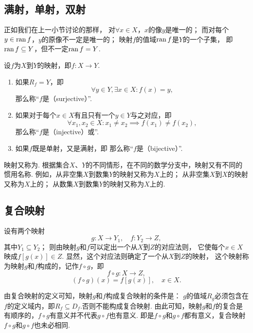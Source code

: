 \subsection{满射，单射，双射}
正如我们在上一小节讨论的那样，
对\(\forall x \in X\)，\(x\)的像\(y\)是唯一的；
而对每个\(y \in \operatorname{ran} f\)，\(y\)的原像不一定是唯一的；
映射\(f\)的值域\(\operatorname{ran} f\)是\(Y\)的一个子集，
即\(\operatorname{ran} f \subseteq Y\)，但不一定\(\operatorname{ran} f = Y\).

\begin{definition}
	设\(f\)为\(X\)到\(Y\)的映射，即\(f\colon X \to Y\).
	\begin{enumerate}
		\item 如果\(R_f = Y\)，即\[
			\forall y \in Y, \exists x \in X:
			f(x) = y,
		\]
		那么称“\(f\)是（surjective）”.

		\item 如果对于每个\(x \in X\)有且只有一个\(y \in Y\)与之对应，即\[
			\forall x_1, x_2 \in X:
			x_1 \neq x_2
			\implies
			f(x_1) \neq f(x_2),
		\]
		那么称“\(f\)是（injective）或”.

		\item 如果\(f\)既是单射，又是满射，即
		那么称“\(f\)是（bijective）”.
	\end{enumerate}
\end{definition}

映射又称为.
根据集合\(X\)、\(Y\)的不同情形，在不同的数学分支中，映射又有不同的惯用名称.
例如，从非空集\(X\)到数集\(Y\)的映射又称为\(X\)上的；
从非空集\(X\)到\(X\)的映射又称为\(X\)上的；
从数集\(X\)到数集\(Y\)的映射又称为\(X\)上的.

\subsection{复合映射}
\begin{definition}
设有两个映射\[
g\colon X \to Y_1, \quad f\colon Y_2 \to Z,
\]其中\(Y_1 \subseteq Y_2\)；
则由映射\(g\)和\(f\)可以定出一个从\(X\)到\(Z\)的对应法则，
它使每个\(x \in X\)映成\(f[g(x)] \in Z\).
显然，这个对应法则确定了一个从\(X\)到\(Z\)的映射，
这个映射称为映射\(g\)和\(f\)构成的，记作\(f \circ g\)，即\[
f \circ g: X \to Z,
\]\[
(f \circ g)(x) = f[g(x)], \quad x \in X.
\]

由复合映射的定义可知，映射\(g\)和\(f\)构成复合映射的条件是：
\(g\)的值域\(R_g\)必须包含在\(f\)的定义域内，即\(R_f \subseteq D_f\).否则不能构成复合映射.
由此可知，映射\(g\)和\(f\)的复合是有顺序的，\(f \circ g\)有意义并不代表\(g \circ f\)也有意义.
即是\(f \circ g\)和\(g \circ f\)都有意义，复合映射\(f \circ g\)和\(g \circ f\)也未必相同.
\end{definition}

